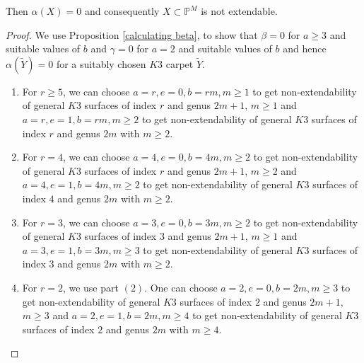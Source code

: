 \documentclass[11pt,twoside]{amsart}
\theoremstyle{plain}
\numberwithin{equation}{section}
\theoremstyle{definition}
\begin{document}
Then $\alpha(X) = 0$ and consequently $X \subset \mathbb{P}^M$ is not extendable.

\begin{proof}
    We use Proposition \ref{calculating beta}, to show that $\beta = 0$ for $a \geq 3$ and suitable values of $b$ and $\gamma = 0$ for $a = 2$ and suitable values of $b$ and hence $\alpha(\widetilde{Y}) = 0$ for a suitably chosen $K3$ carpet $\widetilde{Y}$. 
    \begin{enumerate}
        \item[(1)] For $r \geq 5$, we can choose $a = r, e = 0, b = rm, m \geq 1$ to get non-extendability of general $K3$ surfaces of index $r$ and genus $2m+1$, $m \geq 1$ and $a = r, e = 1, b = rm, m \geq 2$ to get non-extendability of general $K3$ surfaces of index $r$ and genus $2m$ with $m \geq 2$. 

        \smallskip
        
        \item[(2)] For $r = 4$, we can choose $a = 4, e = 0, b = 4m, m \geq 2$ to get non-extendability of general $K3$ surfaces of index $r$ and genus $2m+1$, $m \geq 2$ and $a = 4, e = 1, b = 4m, m \geq 2$ to get non-extendability of general $K3$ surfaces of index $4$ and genus $2m$ with $m \geq 2$. 

       \smallskip
        
        \item[(3)] For $r = 3$, we can choose $a = 3, e = 0, b = 3m, m \geq 2$ to get non-extendability of general $K3$ surfaces of index $3$ and genus $2m+1$, $m \geq 1$ and $a = 3, e = 1, b = 3m, m \geq 3$ to get non-extendability of general $K3$ surfaces of index $3$ and genus $2m$ with $m \geq 2$. 
        
        \smallskip

        \item[(4)] For $r = 2$, we use part $(2)$. One can choose $a = 2, e = 0, b = 2m, m \geq 3$ to get non-extendability of general $K3$ surfaces of index $2$ and genus $2m+1$, $m \geq 3$ and $a = 2, e = 1, b = 2m, m \geq 4$ to get non-extendability of general $K3$ surfaces of index $2$ and genus $2m$ with $m \geq 4$.
       

\end{enumerate}
\end{proof}
\end{document}
